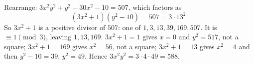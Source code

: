 Rearrange: $3x^2y^2+y^2-30x^2-10=507$, which factors as
\[
(3x^2+1)(y^2-10)=507=3\cdot13^2 .
\]
So $3x^2+1$ is a positive divisor of $507$: one of $1,3,13,39,169,507$. It is $\equiv1\pmod3$, leaving $1,13,169$. $3x^2+1=1$ gives $x=0$ and $y^2=517$, not a square; $3x^2+1=169$ gives $x^2=56$, not a square; $3x^2+1=13$ gives $x^2=4$ and then $y^2-10=39$, $y^2=49$. Hence $3x^2y^2=3\cdot4\cdot49=\boxed{588}$.

